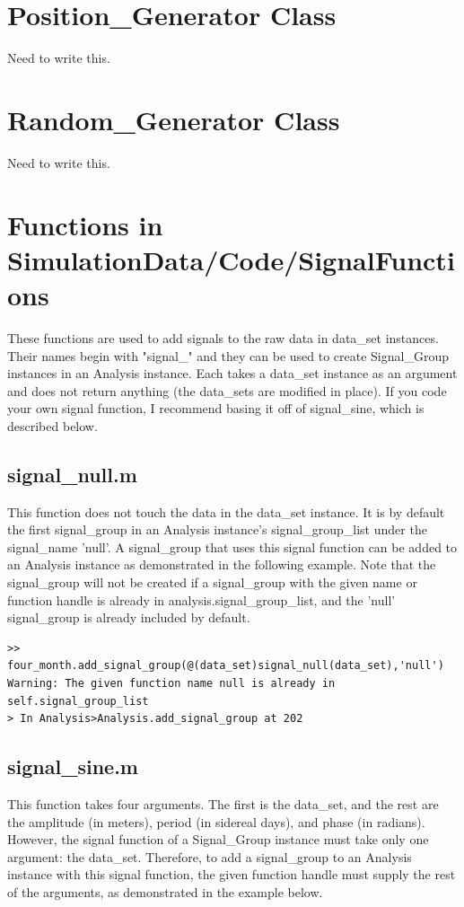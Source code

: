 \documentclass[12pt]{report}
\begin{document}
\chapter{Position\_Generator Class}
Need to write this.





\chapter{Random\_Generator Class}
Need to write this.





\chapter{Functions in SimulationData/Code/SignalFunctions}
\label{chap:SignalFunctions}
These functions are used to add signals to the raw data in data\_set instances.  Their names begin with "signal\_" and they can be used to create Signal\_Group instances in an Analysis instance.  Each takes a data\_set instance as an argument and does not return anything (the data\_sets are modified in place).  If you code your own signal function, I recommend basing it off of signal\_sine, which is described below.

\section{signal\_null.m}
This function does not touch the data in the data\_set instance.  It is by default the first signal\_group in an Analysis instance's signal\_group\_list under the signal\_name 'null'.  A signal\_group that uses this signal function can be added to an Analysis instance as demonstrated in the following example.  Note that the signal\_group will not be created if a signal\_group with the given name or function handle is already in analysis.signal\_group\_list, and the 'null' signal\_group is already included by default.

\begin{verbatim}
>> four_month.add_signal_group(@(data_set)signal_null(data_set),'null')
Warning: The given function name null is already in self.signal_group_list 
> In Analysis>Analysis.add_signal_group at 202 
\end{verbatim}

\section{signal\_sine.m}
This function takes four arguments.  The first is the data\_set, and the rest are the amplitude (in meters), period (in sidereal days), and phase (in radians).  However, the signal function of a Signal\_Group instance must take only one argument: the data\_set.  Therefore, to add a signal\_group to an Analysis instance with this signal function, the given function handle must supply the rest of the arguments, as demonstrated in the example below.
\end{document}
